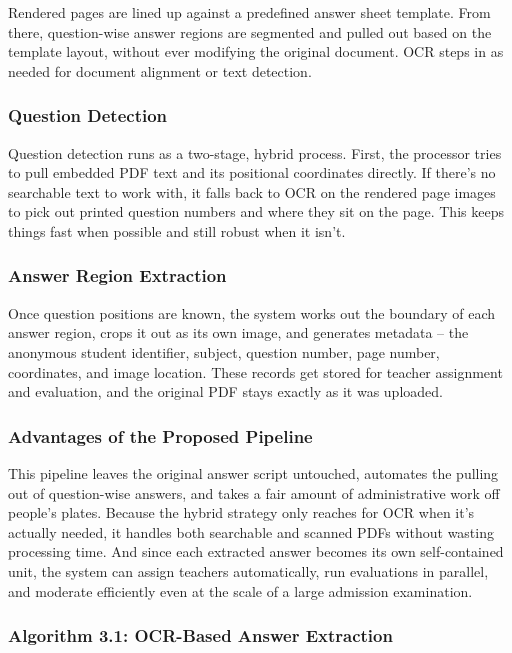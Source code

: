 Rendered pages are lined up against a predefined answer sheet template. From there, question-wise answer regions are segmented and pulled out based on the template layout, without ever modifying the original document. OCR steps in as needed for document alignment or text detection.

\subsubsection{Question Detection}

Question detection runs as a two-stage, hybrid process. First, the processor tries to pull embedded PDF text and its positional coordinates directly. If there's no searchable text to work with, it falls back to OCR on the rendered page images to pick out printed question numbers and where they sit on the page. This keeps things fast when possible and still robust when it isn't.

\subsubsection{Answer Region Extraction}

Once question positions are known, the system works out the boundary of each answer region, crops it out as its own image, and generates metadata -- the anonymous student identifier, subject, question number, page number, coordinates, and image location. These records get stored for teacher assignment and evaluation, and the original PDF stays exactly as it was uploaded.

\subsubsection{Advantages of the Proposed Pipeline}

This pipeline leaves the original answer script untouched, automates the pulling out of question-wise answers, and takes a fair amount of administrative work off people's plates. Because the hybrid strategy only reaches for OCR when it's actually needed, it handles both searchable and scanned PDFs without wasting processing time. And since each extracted answer becomes its own self-contained unit, the system can assign teachers automatically, run evaluations in parallel, and moderate efficiently even at the scale of a large admission examination.

\subsubsection*{Algorithm 3.1: OCR-Based Answer Extraction}

